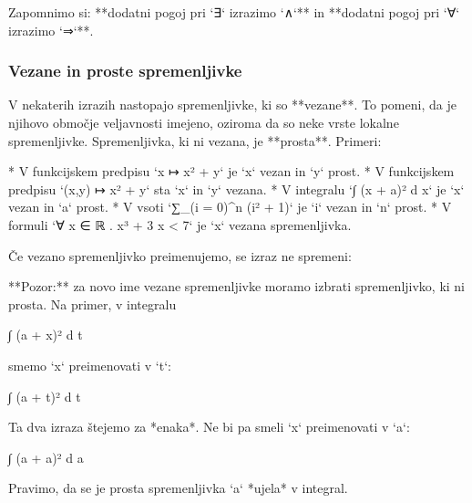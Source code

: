 Zapomnimo si: **dodatni pogoj pri `∃` izrazimo `∧`** in **dodatni pogoj pri `∀` izrazimo `⇒`**.

\subsubsection{Vezane in proste spremenljivke}

V nekaterih izrazih nastopajo spremenljivke, ki so **vezane**. To pomeni, da je njihovo območje veljavnosti imejeno,
oziroma da so neke vrste lokalne spremenljivke. Spremenljivka, ki ni vezana, je **prosta**. Primeri:

* V funkcijskem predpisu `x ↦ x² + y` je `x` vezan in `y` prost.
* V funkcijskem predpisu `(x,y) ↦ x² + y` sta `x` in `y` vezana.
* V integralu `∫ (x + a)² d x` je `x` vezan in `a` prost.
* V vsoti `∑_(i = 0)^n (i² + 1)` je `i` vezan in `n` prost.
* V formuli `∀ x ∈ ℝ . x³ + 3 x < 7` je `x` vezana spremenljivka.

Če vezano spremenljivko preimenujemo, se izraz ne spremeni:

**Pozor:** za novo ime vezane spremenljivke moramo izbrati spremenljivko, ki ni prosta. Na primer, v integralu

    ∫ (a + x)² d t

smemo `x` preimenovati v `t`:

    ∫ (a + t)² d t

Ta dva izraza štejemo za *enaka*. Ne bi pa smeli `x` preimenovati v `a`:

    ∫ (a + a)² d a

Pravimo, da se je prosta spremenljivka `a` *ujela* v integral.

